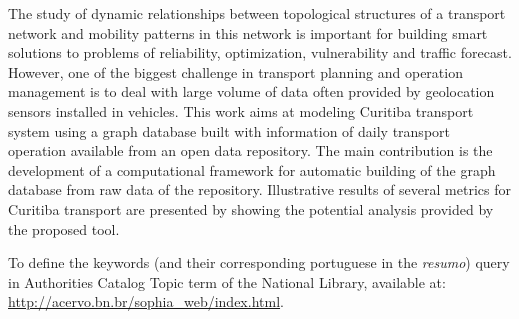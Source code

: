 
\begin{abstractutfpr}%
The study of dynamic relationships between topological structures of a transport network and mobility patterns in this network is important for building smart solutions to problems of reliability, optimization, vulnerability and traffic forecast. However, one of the biggest challenge in transport planning and operation management is to deal with large volume of data often provided by geolocation sensors installed in vehicles. This work aims at modeling Curitiba transport system using a graph database built with information of daily transport operation available from an open data repository. The main contribution is the development of a computational framework for automatic building of the graph database from raw data of the repository. Illustrative results of several metrics for Curitiba transport are presented by showing the potential analysis provided by the proposed tool.

To define the keywords (and their corresponding portuguese in the \textit{resumo}) query in Authorities Catalog Topic term of the National Library, available at: \url{http://acervo.bn.br/sophia_web/index.html}.
\end{abstractutfpr}
